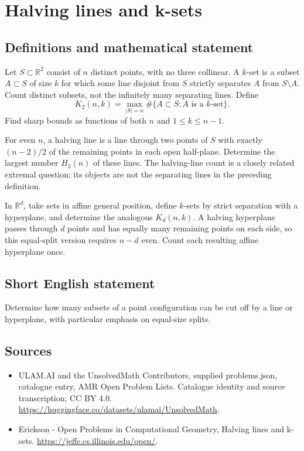 \documentclass[11pt,a4paper]{article}
\begin{document}
\section*{Halving lines and k-sets}\label{statement}

\subsection{Definitions and mathematical statement}
Let $S\subset\mathbb R^2$ consist of $n$ distinct points, with no three
collinear. A $k$-set is a subset $A\subset S$ of size $k$ for which some
line disjoint from $S$ strictly separates $A$ from $S\setminus A$.
Count distinct subsets, not the infinitely many separating lines. Define
\[
 K_2(n,k)=\max_{|S|=n}\#\{A\subset S:A\text{ is a }k\text{-set}\}.
\]
Find sharp bounds as functions of both $n$ and $1\le k\le n-1$.

For even $n$, a halving line is a line through two points of $S$ with
exactly $(n-2)/2$ of the remaining points in each open half-plane. Determine
the largest number $H_2(n)$ of these lines. The halving-line count is a
closely related extremal question; its objects are not the separating
lines in the preceding definition.

In $\mathbb R^d$, take sets in affine general position, define $k$-sets by
strict separation with a hyperplane, and determine the analogous
$K_d(n,k)$. A halving hyperplane passes through $d$ points and has equally
many remaining points on each side, so this equal-split version requires
$n-d$ even. Count each resulting affine hyperplane once.
\subsection{Short English statement}
Determine how many subsets of a point configuration can be cut off by
a line or hyperplane, with particular emphasis on equal-size splits.
\subsection{Sources}
\begin{itemize}
\item[S1] ULAM.AI and the UnsolvedMath Contributors, supplied problems.json, catalogue entry, AMR Open Problem Lists. Catalogue identity and source transcription; CC BY 4.0.
\url{https://huggingface.co/datasets/ulamai/UnsolvedMath}.
\item[S2] Erickson - Open Problems in Computational Geometry, Halving lines and k-sets. 
\url{https://jeffe.cs.illinois.edu/open/}.
\end{itemize}
\end{document}
